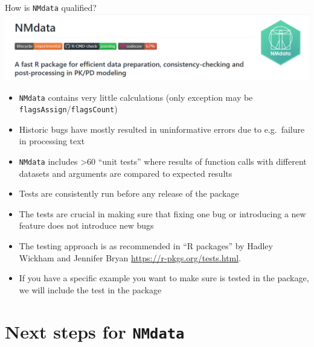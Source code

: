 \documentclass[
  8pt,
  ignorenonframetext,
  aspectratio=169]{beamer}
\begin{document}
\begin{frame}[fragile]{How is \texttt{NMdata} qualified?}
\protect\hypertarget{how-is-nmdata-qualified}{}
\includegraphics[width=.8\textwidth]{badges_snip}

\begin{itemize}
\item
  \texttt{NMdata} contains very little calculations (only exception may
  be \texttt{flagsAssign}/\texttt{flagsCount})
\item
  Historic bugs have mostly resulted in uninformative errors due to
  e.g.~failure in processing text
\item
  \texttt{NMdata} includes \textgreater60 ``unit tests'' where results
  of function calls with different datasets and arguments are compared
  to expected results
\item
  Tests are consistently run before any release of the package
\item
  The tests are crucial in making sure that fixing one bug or
  introducing a new feature does not introduce new bugs
\item
  The testing approach is as recommended in ``R packages'' by Hadley
  Wickham and Jennifer Bryan \url{https://r-pkgs.org/tests.html}.
\item
  If you have a specific example you want to make sure is tested in the
  package, we will include the test in the package
\end{itemize}
\end{frame}

\hypertarget{next-steps-for-nmdata}{%
\section{\texorpdfstring{Next steps for
\texttt{NMdata}}{Next steps for NMdata}}\label{next-steps-for-nmdata}}
\end{document}
